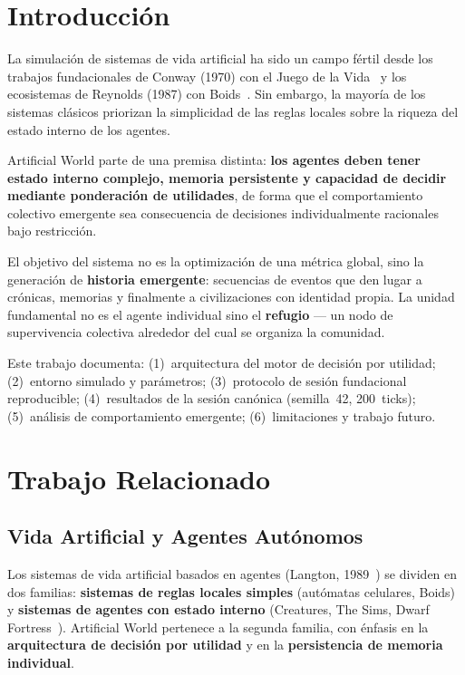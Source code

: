 \documentclass[11pt,a4paper,twocolumn]{article}
\begin{document}
\section{Introducci\'on}

La simulaci\'on de sistemas de vida artificial ha sido un campo f\'ertil
desde los trabajos fundacionales de Conway (1970) con el Juego de la
Vida~\cite{Conway1970} y los ecosistemas de Reynolds (1987) con
Boids~\cite{Reynolds1987}.
Sin embargo, la mayor\'ia de los sistemas cl\'asicos priorizan la
simplicidad de las reglas locales sobre la riqueza del estado interno
de los agentes.

Artificial World parte de una premisa distinta: \textbf{los agentes
deben tener estado interno complejo, memoria persistente y capacidad de
decidir mediante ponderaci\'on de utilidades}, de forma que el
comportamiento colectivo emergente sea consecuencia de decisiones
individualmente racionales bajo restricci\'on.

El objetivo del sistema no es la optimizaci\'on de una m\'etrica global,
sino la generaci\'on de \textbf{historia emergente}: secuencias de
eventos que den lugar a cr\'onicas, memorias y finalmente a
civilizaciones con identidad propia. La unidad fundamental no es el
agente individual sino el \textbf{refugio} --- un nodo de supervivencia
colectiva alrededor del cual se organiza la comunidad.

Este trabajo documenta: (1)~arquitectura del motor de decisi\'on por
utilidad; (2)~entorno simulado y par\'ametros; (3)~protocolo de sesi\'on
fundacional reproducible; (4)~resultados de la sesi\'on can\'onica
(semilla~42, 200~ticks); (5)~an\'alisis de comportamiento emergente;
(6)~limitaciones y trabajo futuro.

\section{Trabajo Relacionado}

\subsection{Vida Artificial y Agentes Aut\'onomos}

Los sistemas de vida artificial basados en agentes (Langton,
1989~\cite{Langton1989}) se dividen en dos familias:
\textbf{sistemas de reglas locales simples} (aut\'omatas celulares,
Boids) y \textbf{sistemas de agentes con estado interno} (Creatures,
The Sims, Dwarf Fortress~\cite{Adams2006}).
Artificial World pertenece a la segunda familia, con \'enfasis en la
\textbf{arquitectura de decisi\'on por utilidad} y en la
\textbf{persistencia de memoria individual}.
\end{document}
